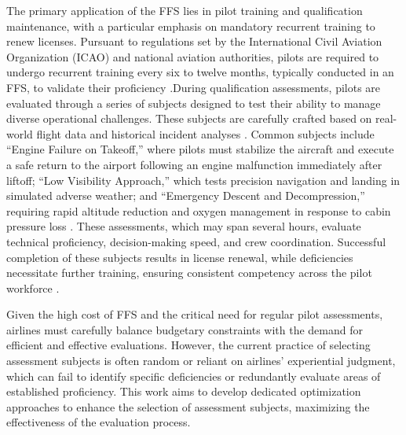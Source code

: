 \documentclass[opre,sglanonrev]{informs4}
\begin{document}
The primary application of the FFS lies in pilot training and qualification maintenance, with a particular emphasis on mandatory recurrent training to renew licenses. Pursuant to regulations set by the International Civil Aviation Organization (ICAO) and national aviation authorities, pilots are required to undergo recurrent training every six to twelve months, typically conducted in an FFS, to validate their proficiency \citep{Flightradar2024}.During qualification assessments, pilots are evaluated through a series of subjects designed to test their ability to manage diverse operational challenges. These subjects are carefully crafted based on real-world flight data and historical incident analyses%
\citep{NTSB2012}. Common subjects include ``Engine Failure on Takeoff,'' where pilots must stabilize the aircraft and execute a safe return to the airport following an engine malfunction immediately after liftoff; ``Low Visibility Approach,'' which tests precision navigation and landing in simulated adverse weather; and ``Emergency Descent and Decompression,'' requiring rapid altitude reduction and oxygen management in response to cabin pressure loss \citep{PilotWorkshops2023}. These assessments, which may span several hours, evaluate technical proficiency, decision-making speed, and crew coordination. Successful completion of these subjects results in license renewal, while deficiencies necessitate further training, ensuring consistent competency across the pilot workforce \citep{EASA2020}.

Given the high cost of FFS and the critical need for regular pilot assessments, airlines must carefully balance budgetary constraints with the demand for efficient and effective evaluations. However, the current practice of selecting assessment subjects is often random or reliant on airlines' experiential judgment, which can fail to identify specific deficiencies or redundantly evaluate areas of established proficiency. This work aims to develop dedicated optimization approaches to enhance the selection of assessment subjects, maximizing the effectiveness of the evaluation process.
\end{document}

